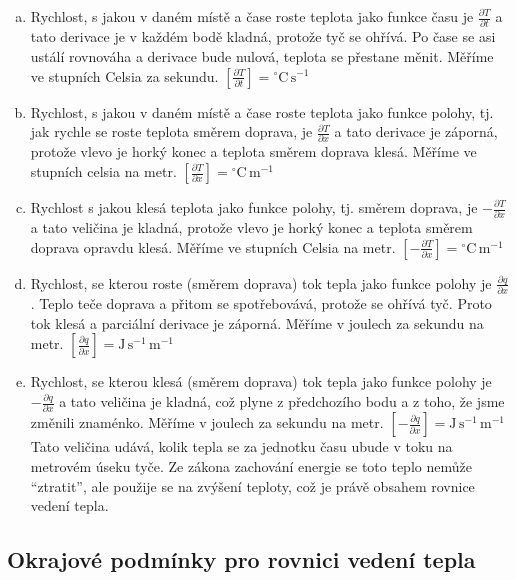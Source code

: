 \reseni
\begin{enumerate}[a)]
\item Rychlost, s jakou v daném místě a čase roste teplota jako funkce času je $\frac {\partial T}{\partial t}$ a tato derivace je v každém bodě kladná, protože tyč se ohřívá. Po čase se asi ustálí rovnováha a derivace bude nulová, teplota se přestane měnit. Měříme ve stupních Celsia za sekundu.
  $\left[\frac {\partial T}{\partial t}\right]={}^\circ\mathrm{C}\,\mathrm{s}^{-1}$
\item Rychlost, s jakou v daném místě a čase roste teplota jako funkce polohy, tj. jak rychle se roste teplota směrem doprava, je $\frac {\partial T}{\partial x}$ a tato derivace je záporná, protože vlevo je horký konec a teplota směrem doprava klesá. Měříme ve stupních celsia na metr.
    $\left[\frac {\partial T}{\partial x}\right]={}^\circ\mathrm{C}\,\mathrm{m}^{-1}$
  \item Rychlost s jakou klesá teplota jako funkce polohy, tj. směrem doprava, je $-\frac {\partial T}{\partial x}$ a tato veličina je kladná, protože vlevo je horký konec a teplota směrem doprava opravdu klesá. Měříme ve stupních Celsia na metr.
        $\left[-\frac {\partial T}{\partial x}\right]={}^\circ\mathrm{C}\,\mathrm{m}^{-1}$

\item Rychlost, se kterou roste (směrem doprava) tok tepla jako funkce polohy je $\frac {\partial q}{\partial x}$. Teplo teče doprava a přitom se spotřebovává, protože se ohřívá tyč. Proto tok klesá a parciální derivace je záporná.
  Měříme v joulech za sekundu na metr.
          $\left[\frac {\partial q}{\partial x}\right]=\mathrm{J}\,\mathrm{s}^{-1}\,\mathrm{m}^{-1}$
\item Rychlost, se kterou klesá (směrem doprava) tok tepla jako funkce polohy je $-\frac {\partial q}{\partial x}$ a tato veličina je kladná, což plyne z předchozího bodu a z toho, že jsme změnili znaménko.
  Měříme v joulech za sekundu na metr.
            $\left[-\frac {\partial q}{\partial x}\right]=\mathrm{J}\,\mathrm{s}^{-1}\,\mathrm{m}^{-1}$ Tato veličina udává, kolik tepla se za jednotku času ubude v toku na metrovém úseku tyče. Ze zákona zachování energie se toto teplo nemůže ``ztratit'', ale použije se na zvýšení teploty, což je právě obsahem rovnice vedení tepla.
\end{enumerate}

\konec




\subsection{Okrajové podmínky pro rovnici vedení tepla}


